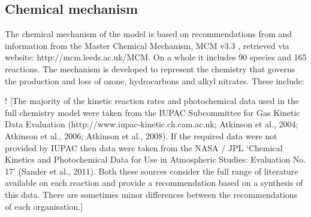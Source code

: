 \documentclass[11pt,a4paper]{article}
\begin{document}
\subsection{Chemical mechanism}
The chemical mechanism of the model is based on recommendations from \citep{Atkinson2004} and information from the Master Chemical Mechanism, MCM v3.3 \citep{Jenkin1997,Saunders2003}, retrieved via website: http://mcm.leeds.ac.uk/MCM. On a whole it includes 90 species and 165 reactions. The mechanism is developed to represent the chemistry that governs the production and loss of ozone, hydrocarbons and alkyl nitrates. These include:

! \citep{Newland2013}
[The majority of the kinetic reaction rates and photochemical data used in the full chemistry model were taken from the IUPAC Subcommittee for Gas Kinetic Data Evaluation (http://www.iupac-kinetic.ch.cam.ac.uk; Atkinson et al., 2004; Atkinson et al., 2006; Atkinson et al., 2008). If the required data were not provided by IUPAC then data were taken from the NASA / JPL ‘Chemical Kinetics and Photochemical Data for Use in Atmospheric Studies: Evaluation No. 17’ (Sander et al., 2011). Both these sources consider the full range of literature available on each reaction and provide a recommendation based on a synthesis of this data. There are sometimes minor differences between the recommendations of each organisation.]
\end{document}
